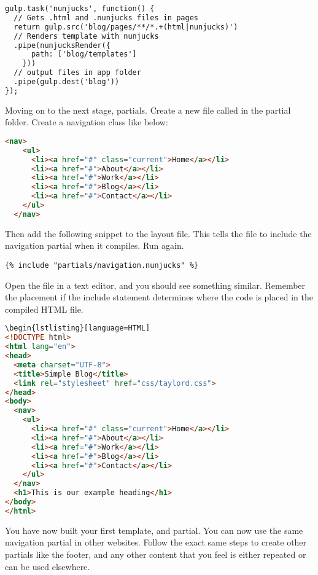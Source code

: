 \begin{lstlisting}[language=HTML]
gulp.task('nunjucks', function() {
  // Gets .html and .nunjucks files in pages
  return gulp.src('blog/pages/**/*.+(html|nunjucks)')
  // Renders template with nunjucks
  .pipe(nunjucksRender({
      path: ['blog/templates']
    }))
  // output files in app folder
  .pipe(gulp.dest('blog'))
});
\end{lstlisting}

Moving on to the next stage, partials. Create a new file called  in the partial folder. Create a navigation class like below: 


\begin{lstlisting}[language=HTML]
  <nav>
    <ul>
      <li><a href="#" class="current">Home</a></li>
      <li><a href="#">About</a></li>
      <li><a href="#">Work</a></li>
      <li><a href="#">Blog</a></li>
      <li><a href="#">Contact</a></li>
    </ul>
  </nav>
\end{lstlisting}

Then add the following snippet to the layout file. This tells the  file to include the navigation partial when it compiles. Run  again.
\begin{lstlisting}[language=CSS3]
{% include "partials/navigation.nunjucks" %}
\end{lstlisting}

Open the file in a text editor, and you should see something similar. Remember the placement if the include statement determines where the code is placed in the compiled HTML file. 

\begin{lstlisting}[language=HTML]
\begin{lstlisting}[language=HTML]
<!DOCTYPE html>
<html lang="en">
<head>
  <meta charset="UTF-8">
  <title>Simple Blog</title>
  <link rel="stylesheet" href="css/taylord.css">
</head>
<body>
  <nav>
    <ul>
      <li><a href="#" class="current">Home</a></li>
      <li><a href="#">About</a></li>
      <li><a href="#">Work</a></li>
      <li><a href="#">Blog</a></li>
      <li><a href="#">Contact</a></li>
    </ul>
  </nav>
  <h1>This is our example heading</h1>
</body>
</html>
\end{lstlisting}

You have now built your first template, and partial. You can now  use the same navigation partial in other websites. Follow the exact same steps to create other partials like the footer, and any other content that you feel is either repeated or can be used elsewhere. 